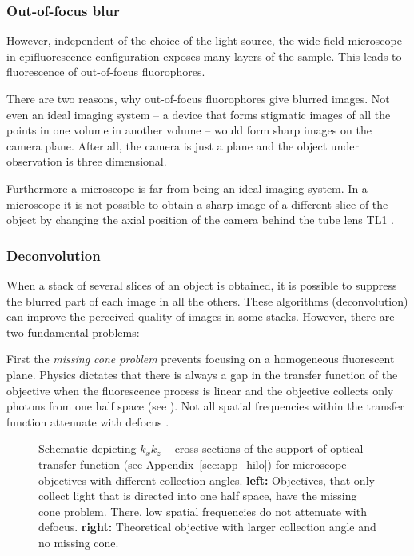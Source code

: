 \subsubsection{Out-of-focus blur}
However, independent of the choice of the light source, the wide field
microscope in epifluorescence configuration exposes many layers of the
sample. This leads to fluorescence of out-of-focus fluorophores.

There are two reasons, why out-of-focus fluorophores give blurred
images. Not even an ideal imaging system -- a device that forms
stigmatic images of all the points in one volume in another volume --
would form sharp images on the camera plane. After all, the camera is
just a plane and the object under observation is three dimensional.

Furthermore a microscope is far from being an ideal imaging system. In
a microscope it is not possible to obtain a sharp image of a different
slice of the object by changing the axial position of the camera
behind the tube lens TL1 \citep{Botcherby2007,Botcherby2008a}.
\subsubsection*{Deconvolution}
When a stack of several slices of an object is obtained, it is
possible to suppress the blurred part of each image in all the
others. These algorithms (deconvolution) can improve the perceived
quality of images in some stacks. However, there are two fundamental
problems:

First the \emph{missing cone problem} prevents focusing on a
homogeneous fluorescent plane. Physics dictates that there is always a
gap in the transfer function of the objective when the fluorescence
process is linear and the objective collects only photons from one
half space (see ). Not all spatial
frequencies within the transfer function attenuate with defocus
\citep{Neil1997}.

\begin{figure}[!hbt]
  \centering
%  
  \caption{Schematic depicting $k_xk_z-$cross sections of the support
    of optical transfer function (see Appendix~\ref{sec:app_hilo}) for
    microscope objectives with different collection angles. {\bf
      left:} Objectives, that only collect light that is directed into
    one half space, have the missing cone problem. There, low spatial
    frequencies do not attenuate with defocus. {\bf right:} Theoretical
    objective with larger collection angle and no missing cone.}
  \label{fig:missing-cone}
\end{figure}

